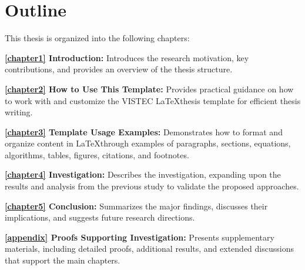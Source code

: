 \section{Outline}
\label{ch1:sec:outline}
\begin{paragraph}
This thesis is organized into the following chapters:

\textbf{\autoref{chapter1} Introduction:}  
Introduces the research motivation, key contributions, and provides an overview of the thesis structure.

\textbf{\autoref{chapter2} How to Use This Template:}  
Provides practical guidance on how to work with and customize the VISTEC \LaTeX thesis template for efficient thesis writing.

\textbf{\autoref{chapter3} Template Usage Examples:}  
Demonstrates how to format and organize content in \LaTeX through examples of paragraphs, sections, equations, algorithms, tables, figures, citations, and footnotes.

\textbf{\autoref{chapter4} Investigation:}  
Describes the investigation, expanding upon the results and analysis from the previous study to validate the proposed approaches.

\textbf{\autoref{chapter5} Conclusion:}  
Summarizes the major findings, discusses their implications, and suggests future research directions.

\textbf{\autoref{appendix} Proofs Supporting Investigation:}  
Presents supplementary materials, including detailed proofs, additional results, and extended discussions that support the main chapters.
\end{paragraph}
